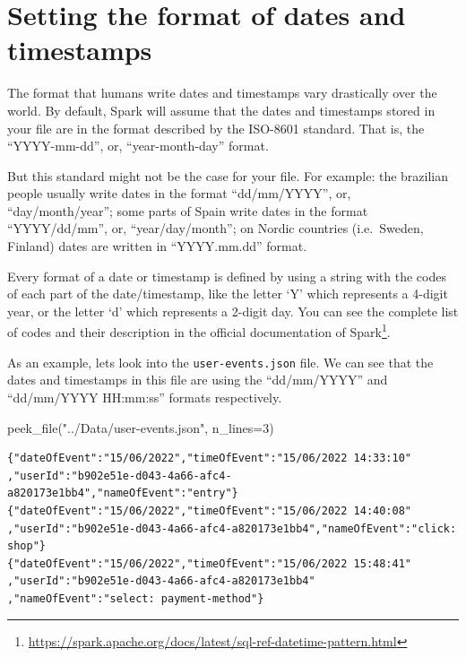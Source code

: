 \documentclass[
  11pt,
  letterpaper,
  DIV=11,
  numbers=noendperiod]{scrreprt}
\newenvironment{Shaded}{\begin{snugshade}}{\end{snugshade}}
\newcommand{\DecValTok}[1]{\textcolor[rgb]{0.68,0.00,0.00}{#1}}
\newcommand{\NormalTok}[1]{\textcolor[rgb]{0.00,0.23,0.31}{#1}}
\newcommand{\OperatorTok}[1]{\textcolor[rgb]{0.37,0.37,0.37}{#1}}
\newcommand{\StringTok}[1]{\textcolor[rgb]{0.13,0.47,0.30}{#1}}
\begin{document}
\hypertarget{setting-the-format-of-dates-and-timestamps}{%
\section{Setting the format of dates and
timestamps}\label{setting-the-format-of-dates-and-timestamps}}

The format that humans write dates and timestamps vary drastically over
the world. By default, Spark will assume that the dates and timestamps
stored in your file are in the format described by the ISO-8601
standard. That is, the ``YYYY-mm-dd'', or, ``year-month-day'' format.

But this standard might not be the case for your file. For example: the
brazilian people usually write dates in the format ``dd/mm/YYYY'', or,
``day/month/year''; some parts of Spain write dates in the format
``YYYY/dd/mm'', or, ``year/day/month''; on Nordic countries
(i.e.~Sweden, Finland) dates are written in ``YYYY.mm.dd'' format.

Every format of a date or timestamp is defined by using a string with
the codes of each part of the date/timestamp, like the letter `Y' which
represents a 4-digit year, or the letter `d' which represents a 2-digit
day. You can see the complete list of codes and their description in the
official documentation of Spark\footnote{\url{https://spark.apache.org/docs/latest/sql-ref-datetime-pattern.html}}.

As an example, lets look into the \texttt{user-events.json} file. We can
see that the dates and timestamps in this file are using the
``dd/mm/YYYY'' and ``dd/mm/YYYY HH:mm:ss'' formats respectively.

\begin{Shaded}
\begin{Highlighting}[]
\NormalTok{peek\_file(}\StringTok{"../Data/user{-}events.json"}\NormalTok{, n\_lines}\OperatorTok{=}\DecValTok{3}\NormalTok{)}
\end{Highlighting}
\end{Shaded}

\begin{verbatim}
{"dateOfEvent":"15/06/2022","timeOfEvent":"15/06/2022 14:33:10"
,"userId":"b902e51e-d043-4a66-afc4-a820173e1bb4","nameOfEvent":"entry"}
{"dateOfEvent":"15/06/2022","timeOfEvent":"15/06/2022 14:40:08"
,"userId":"b902e51e-d043-4a66-afc4-a820173e1bb4","nameOfEvent":"click: shop"}
{"dateOfEvent":"15/06/2022","timeOfEvent":"15/06/2022 15:48:41"
,"userId":"b902e51e-d043-4a66-afc4-a820173e1bb4"
,"nameOfEvent":"select: payment-method"}
\end{verbatim}
\end{document}

